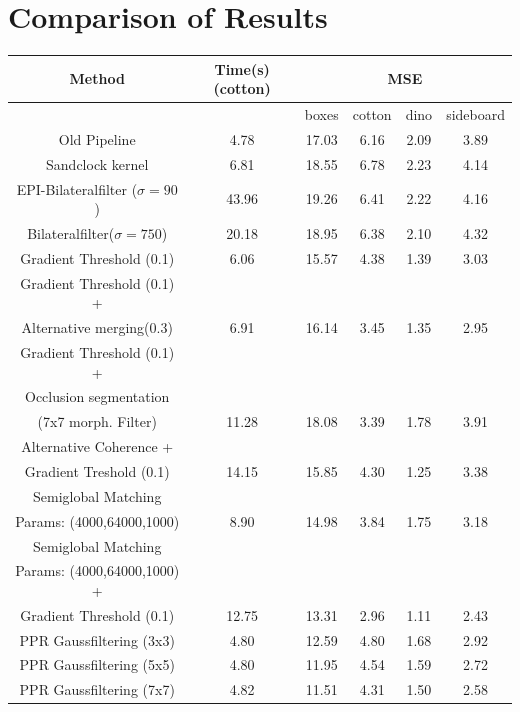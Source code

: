 \documentclass  [
  paper    = a4,
  BCOR     = 10mm,
  twoside,
  fontsize = 12pt,
  fleqn,
  toc      = bibnumbered,
  toc      = listofnumbered,
  numbers  = noendperiod,
  headings = normal,
  listof   = leveldown,
  version  = 3.03
]                                       {scrreprt}
\begin{document}
\section{Comparison of Results}
\begin{table}
	\centering
	\begin{tabular}{|c|c|c|c|c|c|}
		\hline 
		Method & Time(s) (cotton) & \multicolumn{4}{c|}{MSE} \\ 
		\hline 
		&  & boxes & cotton & dino & sideboard \\ 
		\hline
		Old Pipeline & 4.78 & 17.03 & 6.16 & 2.09 & 3.89 \\
		\hline 
		Sandclock kernel & 6.81  & 18.55  & 6.78  & 2.23  & 4.14 \\ 
		\hline 
		EPI-Bilateralfilter ($\sigma = 90$) &  43.96 &  19.26  & 6.41  & 2.22  & 4.16  \\ 
		\hline 
		Bilateralfilter($\sigma = 750$) & 20.18  & 18.95  &  6.38 & 2.10  &4.32  \\ 
		\hline 
		Gradient Threshold (0.1) & 6.06 & 15.57  & 4.38  & 1.39  & 3.03  \\ 
		\hline 
		Gradient Threshold (0.1) +&&&&&\\
		 Alternative merging(0.3) & 6.91 & 16.14 & 3.45 & 1.35 & 2.95 \\
		\hline
		Gradient Threshold (0.1) + &&&&&\\Occlusion segmentation&&&&&\\(7x7 morph. Filter) & 11.28  & 18.08 &  3.39 & 1.78  & 3.91  \\ 
		\hline 
		Alternative Coherence +&&&&&\\Gradient Treshold (0.1) & 14.15  & 15.85  & 4.30  & 1.25  & 3.38  \\ 
		\hline 
		Semiglobal Matching&&&&&\\
		Params: (4000,64000,1000) & 8.90 & 14.98  & 3.84  & 1.75  & 3.18  \\ 
		\hline 
		Semiglobal Matching&&&&&\\
		Params: (4000,64000,1000) +&&&&&\\
		Gradient Threshold (0.1) & 12.75  & 13.31  & 2.96   & 1.11   & 2.43 \\ 
		\hline 
		\hline
		PPR Gaussfiltering (3x3) & 4.80 & 12.59 & 4.80 & 1.68 & 2.92 \\
		\hline
		PPR Gaussfiltering (5x5) &4.80 & 11.95 & 4.54 & 1.59 &  2.72 \\
		\hline 
		PPR Gaussfiltering (7x7) & 4.82& 11.51 & 4.31 & 1.50 & 2.58 \\
		\hline

\end{tabular}
\end{table}
\end{document}

